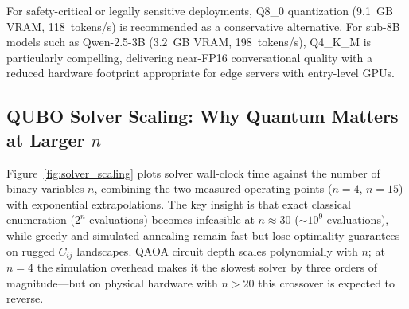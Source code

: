 \documentclass[11pt,a4paper]{article}
\begin{document}
For safety-critical or legally sensitive deployments, Q8\_0 quantization (9.1~GB VRAM, 118~tokens/s) is recommended as a conservative alternative. For sub-8B models such as Qwen-2.5-3B (3.2~GB VRAM, 198~tokens/s), Q4\_K\_M is particularly compelling, delivering near-FP16 conversational quality with a reduced hardware footprint appropriate for edge servers with entry-level GPUs.

\subsection{QUBO Solver Scaling: Why Quantum Matters at Larger $n$}
\label{subsec:disc_scaling}

Figure~\ref{fig:solver_scaling} plots solver wall-clock time against the number of binary variables $n$, combining the two measured operating points ($n{=}4$, $n{=}15$) with exponential extrapolations. The key insight is that exact classical enumeration ($2^n$ evaluations) becomes infeasible at $n{\approx}30$ (${\sim}10^9$ evaluations), while greedy and simulated annealing remain fast but lose optimality guarantees on rugged $C_{ij}$ landscapes. QAOA circuit depth scales polynomially with $n$; at $n{=}4$ the simulation overhead makes it the slowest solver by three orders of magnitude---but on physical hardware with $n{>}20$ this crossover is expected to reverse.
\end{document}
